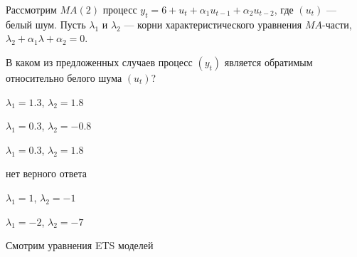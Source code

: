 
\begin{question}
Рассмотрим \(MA(2)\) процесс \(y_t = 6 + u_t + \alpha_1 u_{t-1} + \alpha_2 u_{t-2}\),
где \((u_t)\) --- белый шум.
Пусть \(\lambda_1\) и \(\lambda_2\) --- корни характеристического уравнения \(MA\)-части,
\(\lambda_2 + \alpha_1 \lambda + \alpha_2=0\).

В каком из предложенных случаев процесс \((y_t)\) является обратимым относительно белого шума \((u_t)\)?
\begin{answerlist}
  \item \(\lambda_1 = 1.3\), \(\lambda_2 = 1.8\)
  \item \(\lambda_1 = 0.3\), \(\lambda_2 = -0.8\)
  \item \(\lambda_1 = 0.3\), \(\lambda_2 = 1.8\)
  \item нет верного ответа
  \item \(\lambda_1 = 1\), \(\lambda_2 = -1\)
  \item \(\lambda_1 = -2\), \(\lambda_2 = -7\)
\end{answerlist}
\end{question}

\begin{solution}
Смотрим уравнения ETS моделей
\end{solution}

